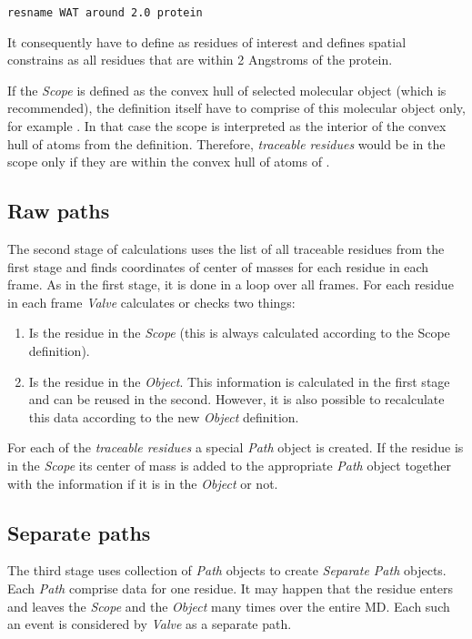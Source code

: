 \documentclass[a4paper,10pt,english]{sphinxmanual}
\begin{document}
\begin{Verbatim}[commandchars=\\\{\}]
resname WAT around 2.0 protein
\end{Verbatim}

It consequently have to define  as residues of interest and defines spatial constrains as all  residues that are within 2 Angstroms of the protein.

If the \emph{Scope} is defined as the convex hull of selected molecular object (which is recommended), the definition itself have to comprise of this molecular object only, for example . In that case the scope is interpreted as the interior of the convex hull of atoms from the definition. Therefore, \emph{traceable residues} would be in the scope only if they are within the convex hull of atoms of .


\subsection{Raw paths}
\label{valve/valve_manual:raw-paths}
The second stage of calculations uses the list of all traceable residues from the first stage and finds coordinates of center of masses for each residue in each frame. As in the first stage, it is done in a loop over all frames. For each residue in each frame \emph{Valve} calculates or checks two things:
\begin{enumerate}
\item {} 
Is the residue in the \emph{Scope} (this is always calculated according to the Scope definition).

\item {} 
Is the residue in the \emph{Object}. This information is calculated in the first stage and can be reused in the second. However, it is also possible to recalculate this data according to the new \emph{Object} definition.

\end{enumerate}

For each of the \emph{traceable residues} a special \emph{Path} object is created. If the residue is in the \emph{Scope} its center of mass is added to the appropriate \emph{Path} object together with the information if it is in the \emph{Object} or not.


\subsection{Separate paths}
\label{valve/valve_manual:separate-paths}
The third stage uses collection of \emph{Path} objects to create \emph{Separate Path} objects. Each \emph{Path} comprise data for one residue. It may happen that the residue enters and leaves the \emph{Scope} and the \emph{Object} many times over the entire MD. Each such an event is considered by \emph{Valve} as a separate path.
\end{document}
